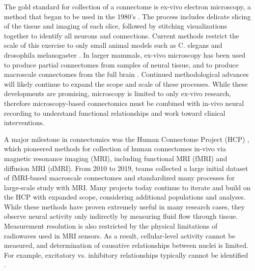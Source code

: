 \documentclass[11pt]{article}
\begin{document}
The gold standard for collection of a connectome is ex-vivo electron microscopy, a method that began to be used in the 1980's \cite{white1986structure, emmons2015connectomics}. The process includes delicate slicing of the tissue and imaging of each slice, followed by stitching visualizations together to identify all neurons and connections. Current methods restrict the scale of this exercise to only small animal models such as C. elegans and drosophila melanogaster \cite{white1986structure, emmons2015connectomics, scheffer2020connectome}. In larger mammals, ex-vivo microscopy has been used to produce partial connectomes from samples of neural tissue, and to produce macroscale connectomes from the full brain \cite{motta2019connectomicreconstruction, helmstaedter2011high, amunts2013bigbrain}. Continued methodological advances will likely continue to expand the scope and scale of these processes. While these developments are promising, microscopy is limited to only ex-vivo research, therefore microscopy-based connectomics must be combined with in-vivo neural recording to understand functional relationships and work toward clinical interventions.

A major milestone in connectomics was the Human Connectome Project (HCP) \cite{elam2021hcp}, which pioneered methods for collection of human connectomes in-vivo via magnetic resonance imaging (MRI), including functional MRI (fMRI) and diffusion MRI (dMRI). From 2010 to 2019, teams collected a large initial dataset of fMRI-based macroscale connectomes and standardized many processes for large-scale study with MRI. Many projects today continue to iterate and build on the HCP with expanded scope, considering additional populations and analyses. While these methods have proven extremely useful in many research cases, they observe neural activity only indirectly by measuring fluid flow through tissue. Measurement resolution is also restricted by the physical limitations of radiowaves used in MRI sensors. As a result, cellular-level activity cannot be measured, and determination of causative relationships between nuclei is limited. For example, excitatory vs. inhibitory relationships typically cannot be identified \cite{hagman2010mriconnectomics}.
\end{document}
